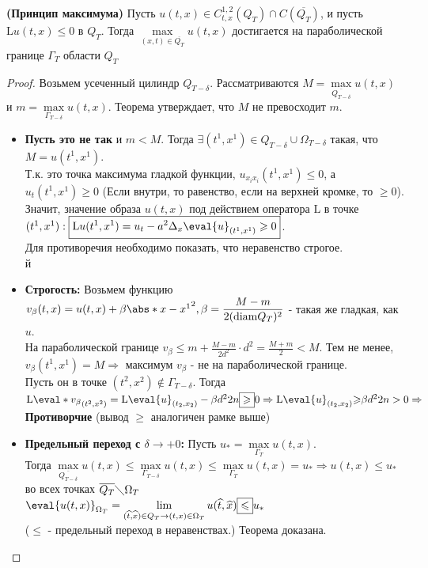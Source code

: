 \begin{theorem}

{\bf (Принцип максимума)} Пусть $u(t,x) \in C_{t, x}^{1,2}(Q_T) \cap C(\overline{Q_T})$, и пусть 
$\mathrm{L}u(t,x) \leq 0$ в $Q_T$. Тогда $\max\limits_{(x,t) \in \overline{Q_T}} u(t,x)$ достигается на параболической границе $ \Gamma_T $ области $Q_T$


\begin{proof}
Возьмем усеченный цилиндр $Q_{T-\delta}$. Рассматриваются $M = \max\limits_{\overline{Q_{T-\delta}}} u(t,x)$ и $m = \max\limits_{\Gamma_{T-\delta}} u(t,x)$. Теорема утверждает, что $M$ не превосходит $m$.\\
\begin{itemize}
\item {\bf Пусть это не так} и $m < M$. Тогда $\exists (t^1,x^1) \in Q_{T-\delta} \cup \Omega_{T-\delta}$ такая, что $M = u(t^1, x^1)$. \\
Т.к. это точка максимума гладкой функции, $u_{x_ix_i}(t^1,x^1) \leq 0$, а $u_t(t^1, x^1) \geq 0$ (Если внутри, то равенство, если на верхней кромке, то $\geq 0$).\\
Значит, значение образа $u(t,x)$ под действием оператора $\mathrm{L}$ в точке $(t^1, x^1): \boxed{\mathrm{L}u(t^1, x^1) = u_t -a^2 \Delta_x \eval{u}_{(t^1,x^1)}  \geq 0}$.\\
Для противоречия необходимо показать, что неравенство строгое.\\

 й\item {\bf Строгость:}
Возьмем функцию $v_\beta(t,x) = u(t,x) +\beta \abs*{x-x^1}^2, \beta = \dfrac{M-m}{2(\mathrm{diam} Q_T)^2}$ - такая же гладкая, как $u$.\\
 На параболической границе $v_\beta \leq m + \frac{M-m}{2d^2}\cdot d^2 = \frac{M+m}{2} < M$.
Тем не менее, $v_\beta(t^1, x^1) = M \Rightarrow$ максимум $v_\beta$ - не на параболической границе.\\
Пусть он в точке $(t^2, x^2) \notin \Gamma_{T-\delta}$. Тогда $\mathrm{L}\eval*{v_\beta}_{(t^2,x^2)} = \mathrm{L}\eval{u}_{(t_2, x_2)} - \beta d^2 2n \boxed{\geqslant} 0 \Rightarrow \mathrm{L}\eval{u}_
{(t_2,x_2)} {\geq} \beta d^2 2n > 0 \Rightarrow$ {\bf Противорчие} (вывод $\boxed{\geq}$ аналогичен рамке выше)
 
\item {\bf Предельный переход с $\delta \rightarrow+0$:}
Пусть $u_{*} = \max\limits_{\Gamma_T} u(t,x)$. \\
Тогда $\max\limits_{\overline{Q_{T-\delta}}}u(t,x) \leq \max\limits_{{\Gamma_{T-\delta}}}u(t,x) \leq \max\limits_{{\Gamma_{T}}}u(t,x) = u_* \Rightarrow
u(t,x) \leq u_*$
во всех точках $\overline{Q_T} \diagdown \Omega_T$\\
$\eval{u(t,x)}_{\Omega_T} = \lim\limits_{(\widehat{t}, \widehat{x}) \in Q_T \rightarrow (t,x) \in \Omega_T} u(\widehat{t},\widehat{x}) \boxed{\leq} u_*$ 
\\($\boxed{\leq}$ - предельный переход в неравенствах.) Теорема доказана.
\end{itemize}

\end{proof}
\end{theorem}



